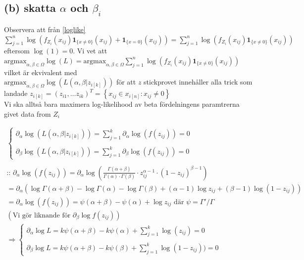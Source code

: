 \documentclass{assignment}
\newcommand{\indicator}[1]{\mathbf{1}_{\{#1\}}}
\begin{document}
\subsection*{(b) skatta $\alpha$ och $\beta_i$}
Observera att från \cref{loglike}  $\sum_{j=1}^n \log \left(f_{Z_i}(x_{ij})\indicator{x\neq0}(x_{ij}) + \indicator{x=0}(x_{ij})\right) = \sum_{j=1}^n \log \left(f_{Z_i}(x_{ij})\indicator{x\neq0}(x_{ij})\right)$ eftersom $\log(1)=0$.
Vi vet att 
\\ $\text{argmax}_{\alpha,\beta\in\Omega}\log(L)=\text{argmax}_{\alpha,\beta\in\Omega}\sum_{j=1}^n \log \left(f_{Z_i}(x_{ij})\indicator{x\neq0}(x_{ij})\right)$ vilket är ekvivalent med 
\\$\text{argmax}_{\alpha,\beta\in\Omega} \log(L(\alpha,\beta|z_{i[k]}))$ för att $z$ stickprovet innehåller alla trick som landade $z_{i[k]}=(z_{i1},\dots z_{ik})^T = \left\{x_{ij}\in x_{i[n]} : x_{ij}\neq 0\right\}$
\\ Vi ska alltså bara maximera log-likelihood av beta fördelningens paramtrerna givet data from $Z_i$

\begin{align*}
    \left\{\begin{matrix}
        \partial_{\alpha}\log(L(\alpha,\beta|z_{i[k]})) = \sum_{j=1}^k \partial_\alpha \log(f(z_{ij})) = 0
        \\ \\ \partial_{\beta}\log(L(\alpha,\beta|z_{i[k]})) = \sum_{j=1}^k \partial_\beta \log(f(z_{ij})) = 0
        \end{matrix}\right.
    \\ 
    \\ \text{:: } \partial_\alpha\log(f(z_{ij})) = \partial_\alpha\log \left( \frac{\Gamma(\alpha + \beta)}{\Gamma(\alpha) \cdot \Gamma(\beta)} \cdot z_{ij}^{\alpha-1} \cdot (1-z_{ij})^{\beta-1}\right) 
    \\  = \partial_\alpha \left(\log \Gamma(\alpha + \beta) - \log\Gamma(\alpha) - \log \Gamma(\beta) + (\alpha-1) \log z_{ij} + (\beta-1)\log (1-z_{ij}) \right)
    \\  = \partial_\alpha\log(f(z_{ij})) = \psi(\alpha+\beta) - \psi(\alpha) + \log z_{ij} \text{  där  } \psi = \Gamma ' / \Gamma 
    \\ \left(\text{Vi gör liknande för } \partial_\beta \log f(z_{ij}) \right)
    \\ \Rightarrow 
    \left\{\begin{matrix}
        \partial_{\alpha}\log L= k\psi(\alpha+\beta)-k\psi(\alpha) + \sum_{j=1}^k\log(z_{ij}) = 0
        \\ \\ \partial_{\beta}\log L= k\psi(\alpha+\beta)-k\psi(\beta) + \sum_{j=1}^k\log(1-z_{ij})) = 0
        \end{matrix}\right.
\end{align*}
\end{document}
